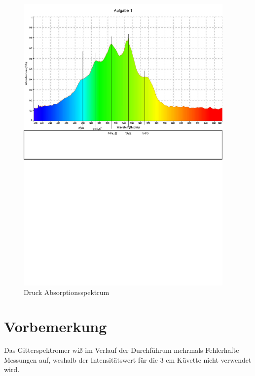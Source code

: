 \begin{figure}[h!]
    \centering
    \includegraphics[page=1, width=0.95\textwidth,]{Marci Nr1.2.pdf}
    \caption{Druck Absorptionsspektrum}
\end{figure}
\newpage


\section{Vorbemerkung}
Das Gitterspektromer wiß im Verlauf der Durchführum mehrmals Fehlerhafte Messungen auf, weshalb der Intensitätswert für die 3 cm Küvette nicht verwendet wird.


